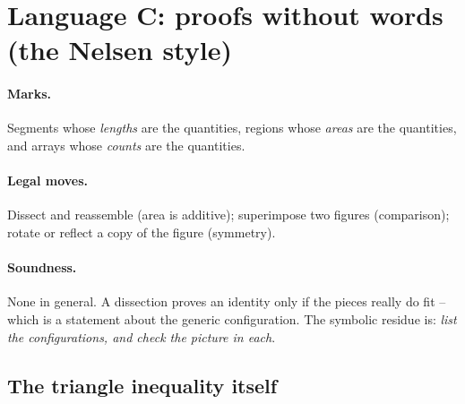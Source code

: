 \section{Language C: proofs without words (the Nelsen style)}
\label{sec:nelsen}

\paragraph{Marks.} Segments whose \emph{lengths} are the quantities, regions whose
\emph{areas} are the quantities, and arrays whose \emph{counts} are the quantities.
\paragraph{Legal moves.} Dissect and reassemble (area is additive); superimpose two
figures (comparison); rotate or reflect a copy of the figure (symmetry).
\paragraph{Soundness.} None in general. A dissection proves an identity only if the
pieces really do fit -- which is a statement about the generic configuration. The
symbolic residue is: \emph{list the configurations, and check the picture in each}.

\subsection{The triangle inequality itself}

